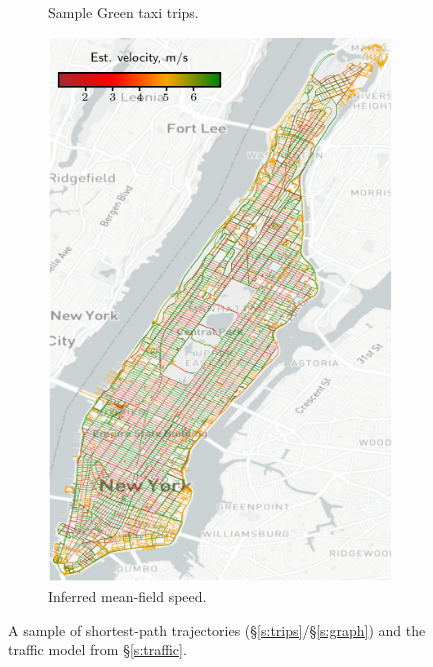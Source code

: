 \documentclass[12pt,notitlepage]{article}
\begin{document}
\begin{figure}[!p]
\begin{subfigure}{0.32\linewidth}
		\caption{Sample Green taxi trips.}
	\end{subfigure}
	\hfill
	\begin{subfigure}{0.32\linewidth}
		\includegraphics[width=\textwidth]{20210613-GraphWithLag/b_train/v1/lag/H=18/UTC-20210615-132827/train/velocity_i=9.png}
		
		\caption{Inferred mean-field speed.}
		\label{f:mfv}
	\end{subfigure}
		
	\vspace{0.25\baselineskip}%
	\vspace{-0.25\baselineskip}

	\caption{%
		A sample of shortest-path trajectories (\S\ref{s:trips}/\S\ref{s:graph})
		and
		the traffic model from \S\ref{s:traffic}.
	}
			
\end{figure}
\end{document}
